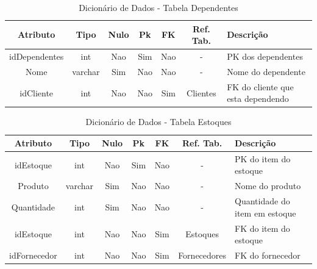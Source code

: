 \documentclass[
	12pt,				%
	openright,			%
	oneside,			%
	a4paper,			%
	chapter=TITLE,		%
	section=TITLE,		%
	english,			%
	brazil				%
	]{abntex2}
\begin{document}
    \begin{table}[htbp]
        \centering
        \caption{Dicionário de Dados - Tabela Dependentes}
        \label{tb1_dicionario_dados_dependentes}
        \begin{tabular}{|c|c|c|c|c|c|p{3cm}|}
            \hline 
            \textbf{Atributo} & 
            \textbf{Tipo} & 
            \textbf{Nulo} & 
            \textbf{Pk} & 
            \textbf{FK} & 
            \textbf{Ref. Tab.} & 
            \textbf{Descrição} \\ \hline
            idDependentes & int & Nao & Sim & Nao & - & PK dos dependentes \\ \hline
            Nome & varchar & Sim & Nao & Nao & - & Nome do dependente \\ \hline
            idCliente & int & Nao & Nao & Sim & Clientes & FK do cliente que esta dependendo \\ \hline
        \end{tabular}
    \end{table}
    
    \begin{table}[htbp]
    \centering
        \caption{Dicionário de Dados - Tabela Estoques}
        \label{tb1_dicionario_dados_estoques}
        \begin{tabular}{|c|c|c|c|c|c|p{3cm}|}
            \hline
            \textbf{Atributo} & 
            \textbf{Tipo} & 
            \textbf{Nulo} & 
            \textbf{Pk} & 
            \textbf{FK} & 
            \textbf{Ref. Tab.} & 
            \textbf{Descrição} \\ \hline
            idEstoque & int & Nao & Sim & Nao & - & PK do item do estoque \\ \hline
            Produto & varchar & Sim & Nao & Nao & - & Nome do produto \\ \hline
            Quantidade & int & Sim & Nao & Nao & - & Quantidade do item em estoque \\ \hline
            idEstoque & int & Nao & Nao & Sim & Estoques & FK do item do estoque \\ \hline
            idFornecedor & int & Nao & Nao & Sim & Fornecedores & FK do fornecedor \\ \hline
        \end{tabular}
    \end{table}
    
\end{document}
